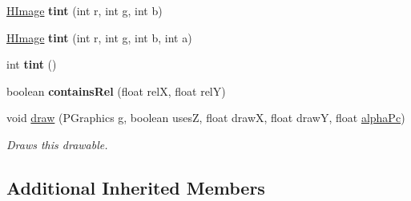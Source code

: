 \begin{DoxyCompactItemize}
\item 
\hypertarget{classhype_1_1extended_1_1drawable_1_1_h_image_ab1b3a95e2f9dbbdcbbd481b9767b664d}{\hyperlink{classhype_1_1extended_1_1drawable_1_1_h_image}{H\-Image} {\bfseries tint} (int r, int g, int b)}\label{classhype_1_1extended_1_1drawable_1_1_h_image_ab1b3a95e2f9dbbdcbbd481b9767b664d}

\item 
\hypertarget{classhype_1_1extended_1_1drawable_1_1_h_image_a0b49463cd10d4c9e1f5544da1ccf6935}{\hyperlink{classhype_1_1extended_1_1drawable_1_1_h_image}{H\-Image} {\bfseries tint} (int r, int g, int b, int a)}\label{classhype_1_1extended_1_1drawable_1_1_h_image_a0b49463cd10d4c9e1f5544da1ccf6935}

\item 
\hypertarget{classhype_1_1extended_1_1drawable_1_1_h_image_aa25ef076ab82dd60f51b136d73ab4e48}{int {\bfseries tint} ()}\label{classhype_1_1extended_1_1drawable_1_1_h_image_aa25ef076ab82dd60f51b136d73ab4e48}

\item 
\hypertarget{classhype_1_1extended_1_1drawable_1_1_h_image_a39fc89ba22e26b0f2cb05342f258fb0c}{boolean {\bfseries contains\-Rel} (float rel\-X, float rel\-Y)}\label{classhype_1_1extended_1_1drawable_1_1_h_image_a39fc89ba22e26b0f2cb05342f258fb0c}

\item 
void \hyperlink{classhype_1_1extended_1_1drawable_1_1_h_image_ad452f286e74b33cda66bafa09cb8cd7a}{draw} (P\-Graphics g, boolean uses\-Z, float draw\-X, float draw\-Y, float \hyperlink{classhype_1_1core_1_1drawable_1_1_h_drawable_ab71ad420ba6d4a5eb981296684033d74}{alpha\-Pc})
\begin{DoxyCompactList}\small\item\em Draws this drawable. \end{DoxyCompactList}\end{DoxyCompactItemize}
\subsection*{Additional Inherited Members}


